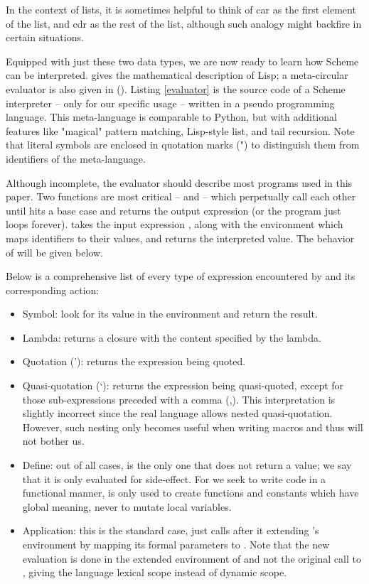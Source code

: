 In the context of lists, it is sometimes helpful to think of car as the first element of the list, and cdr as the rest of the list, although such analogy might backfire in certain situations.

Equipped with just these two data types, we are now ready to learn how Scheme can be interpreted. \textcite{lisp} gives the mathematical description of Lisp; a meta-circular evaluator is also given in (\cite{lisp-man}).
Listing \ref{evaluator} is the source code of a Scheme interpreter -- only for our specific usage -- written in a pseudo programming language. This meta-language is comparable to Python, but with additional features like "magical" pattern matching, Lisp-style list, and tail recursion. Note that literal symbols are enclosed in quotation marks (") to distinguish them from identifiers of the meta-language.

Although incomplete, the evaluator should describe most programs used in this paper. Two functions are most critical --  and  -- which perpetually call each other until  hits a base case and returns the output expression (or the program just loops forever).  takes the input expression , along with the environment  which maps identifiers to their values, and returns the interpreted value. The behavior of  will be given below.


Below is a comprehensive list of every type of expression encountered by  and its corresponding action:
\begin{itemize}
\item Symbol: look for its value in the environment and return the result.
\item Lambda: returns a closure with the content specified by the lambda.
\item Quotation ('): returns the expression being quoted.
\item Quasi-quotation (`): returns the expression being quasi-quoted, except for those sub-expressions preceded with a comma (,). This interpretation is slightly incorrect since the real language allows nested quasi-quotation. However, such nesting only becomes useful when writing macros and thus will not bother us.
\item Define: out of all cases,  is the only one that does not return a value; we say that it is only evaluated for side-effect. For we seek to write code in a functional manner,   is only used to create functions and constants which have global meaning, never to mutate local variables. 
\item Application: this is the standard case,  just calls  after it extending 's environment by mapping its formal parameters to . Note that the new evaluation is done in the extended environment of  and not the original call to , giving the language lexical scope instead of dynamic scope.
\end{itemize}

